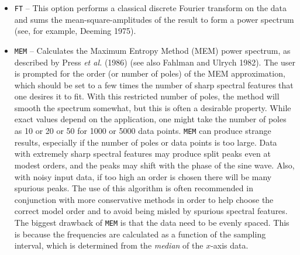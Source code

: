 \begin{itemize}
\item {\tt FT} -- This option performs a classical discrete Fourier transform
on the data and sums the mean-square-amplitudes of the result to form a power
spectrum (see, for example, Deeming 1975). 

\item {\tt MEM} -- Calculates the Maximum Entropy Method (MEM) power spectrum,
as described by Press {\it et al.} (1986) (see also Fahlman and Ulrych 1982).
The user is prompted for the order (or number of poles) of the MEM
approximation, which should be set to a few times the number of sharp spectral
features that one desires it to fit. With this restricted number of poles, the
method will smooth the spectrum somewhat, but this is often a desirable
property. While exact values depend on the application, one might take the
number of poles as 10 or 20 or 50 for 1000 or 5000 data points. {\tt MEM} can
produce strange results, especially if the number of poles or data points is
too large. Data with extremely sharp spectral features may produce split peaks
even at modest orders, and the peaks may shift with the phase of the sine wave.
Also, with noisy input data, if too high an order is chosen there will be many
spurious peaks. The use of this algorithm is often recommended in conjunction
with more conservative methods in order to help choose the correct model order
and to avoid being misled by spurious spectral features. The biggest drawback
of {\tt MEM} is that the data need to be evenly spaced. This is because the
frequencies are calculated as a function of the sampling interval, which is
determined from the {\em median} of the $x$-axis data. 


\end{itemize}
